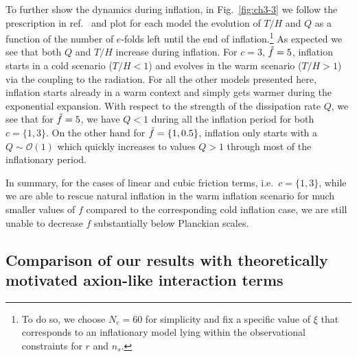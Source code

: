 To further show the dynamics during inflation, in Fig.~\ref{fig:ch3-3} we follow the prescription in ref.~\cite{Reyimuaji:2020bkm} and plot for each model the evolution of $T/H$ and $Q$ as a function of the number of $e$-folds left until the end of inflation.\footnote{To do so, we choose $N_e=60$ for simplicity and fix a specific value of $\xi$ that corresponds to an inflationary model lying within the observational constraints for $r$ and $n_s$.} As expected we see that both $Q$ and $T/H$ increase during inflation. For $c=3$, $\Tilde{f}=5$, inflation starts in a cold scenario ($T/H<1$) and evolves in the warm scenario ($T/H>1$) via the coupling to the radiation. For all the other models presented here, inflation starts already in a warm context and simply gets warmer during the exponential expansion. With respect to the strength of the dissipation rate $Q$, we see that for $\Tilde{f}=5$, we have $Q<1$ during all the inflation period for both $c=\{1,3\}$. On the other hand for $\Tilde{f}=\{1,0.5\}$, inflation only starts with a $Q\sim \mathcal{O}(1)$ which quickly increases to values $Q>1$ through most of the inflationary period.

In summary, for the cases of linear and cubic friction terms, i.e.\ $c=\{1,3\}$, while we are able to rescue natural inflation in the warm inflation scenario for much smaller values of $f$ compared to the corresponding cold inflation case, we are still unable to decrease $f$ substantially below Planckian scales.

\subsection{Comparison of our results with theoretically motivated axion-like interaction terms
}\label{sec:ch3-4.2}

